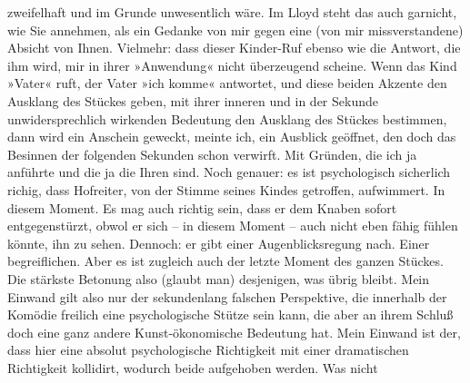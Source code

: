                zweifelhaft und im Grunde unwesentlich wäre. Im Lloyd steht das auch garnicht, wie Sie annehmen, als ein
               Gedanke von mir gegen eine (von mir missverstandene) Absicht von Ihnen. Vielmehr:
               dass dieser Kinder-Ruf ebenso wie die Antwort, die ihm wird, mir in ihrer »Anwendung«
               nicht überzeugend scheine. Wenn das Kind »Vater« ruft, der Vater »ich komme« antwortet, und diese beiden Akzente den Ausklang
               des Stückes geben, mit ihrer
               inneren und in der Sekunde unwidersprechlich wirkenden Bedeutung den Ausklang des Stückes bestimmen, dann wird ein Anschein
               geweckt, meinte ich, ein Ausblick geöffnet, den doch das Besinnen der folgenden
               Sekunden schon verwirft. Mit Gründen, die ich ja anführte und die ja die Ihren sind.
               Noch genauer: es ist psychologisch sicherlich richig, dass Hofreiter, von der Stimme seines Kindes
               getroffen, aufwimmert. In diesem Moment. Es mag auch richtig sein, dass er dem Knaben
               sofort entgegenstürzt, obwol er sich – in diesem Moment – auch nicht eben fähig
               fühlen könnte, ihn zu sehen. Dennoch: er gibt einer Augenblicksregung nach. Einer
               begreiflichen. Aber es ist zugleich auch der letzte Moment des ganzen Stückes. Die stärkste Betonung also (glaubt
               man) desjenigen, was übrig bleibt. Mein Einwand gilt also nur der sekundenlang
               falschen Perspektive, die innerhalb der Komödie freilich eine psychologische Stütze
               sein kann, die aber an ihrem Schluß doch eine ganz andere Kunst-ökonomische Bedeutung
               hat. Mein Einwand ist der, dass hier eine absolut psychologische Richtigkeit mit
               einer dramatischen Richtigkeit kollidirt, wodurch beide aufgehoben werden. Was nicht
